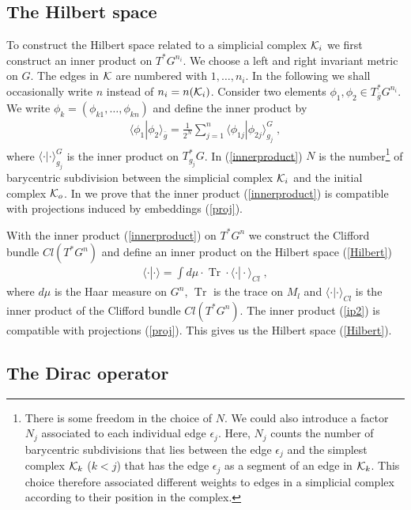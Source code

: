 \documentclass[12pt]{article}
\newcommand{\ba}{\begin{eqnarray}}
\newcommand{\ea}{\end{eqnarray}}
\def\e{\epsilon}
\def\m{\mu}
\def\ck{{\cal K}}
\newcommand{\Tr}{\operatorname{Tr}}
\begin{document}
\subsection{The Hilbert space}
To construct the Hilbert space related to a simplicial complex
$\ck_i$ we first
 construct an inner product on  $T^\ast G^{n_i}$. We choose a left and right invariant
metric on $G$.
The edges in $\ck$ are numbered with $1,\ldots , n_i$. In the following we shall occasionally write $n$ instead of $n_i=n(\ck_i)$. Consider two
elements $\phi_1,\phi_2\in T^\ast_{\bar{g}}G^{n_i}$. We write
$\phi_k=(\phi_{k1},\ldots,\phi_{kn})$ and define the
inner product by
\ba
\langle \phi_1 |\phi_2 \rangle_{\bar{g}} = \frac{1}{2^N}\sum_{j=1}^{n} \langle \phi_{1j} |\phi_{2j} \rangle^G_{g_j}\;,
\label{innerproduct}
\ea
where $\langle \cdot|\cdot\rangle^G_{g_j}$ is the inner product on $T^\ast_{g_j}G$. In (\ref{innerproduct}) $N$ is the number\footnote{There is some freedom in the choice of $N$. We could also introduce a factor $N_j$ associated to each individual edge $\e_j$. Here, $N_j$ counts the number of barycentric subdivisions that lies between the edge $\e_j$ and the simplest complex $\ck_k$ ($k<j$) that has the edge $\e_j$ as a segment of an edge in $\ck_k$. This choice therefore associated different weights to edges in a simplicial complex according to their position in the complex.} of barycentric subdivision between the simplicial complex $\ck_i$ and the initial complex $\ck_o$. 
In \cite{Aastrup} we prove that the inner product (\ref{innerproduct}) is compatible with projections induced by embeddings (\ref{proj}). 

With the inner product (\ref{innerproduct}) on $T^\ast G^n$ we construct the Clifford bundle $Cl(T^\ast G^n)$ and define an inner product on the Hilbert space (\ref{Hilbert})
\ba
\langle\cdot|\cdot\rangle =\int d\m \cdot \Tr\cdot \langle \cdot|\cdot\rangle_{Cl} \;,
\label{ip2}
\ea
where $d\m$ is the Haar measure on $G^n$, $\Tr$ is the trace on $M_l$ and $\langle \cdot|\cdot\rangle_{Cl}$ is the inner product of the Clifford bundle $Cl(T^\ast G^n)$. The inner product (\ref{ip2}) is compatible with projections (\ref{proj}). This gives us the Hilbert space (\ref{Hilbert}).






\subsection{The Dirac operator}
\label{sectiondirac}
\end{document}
